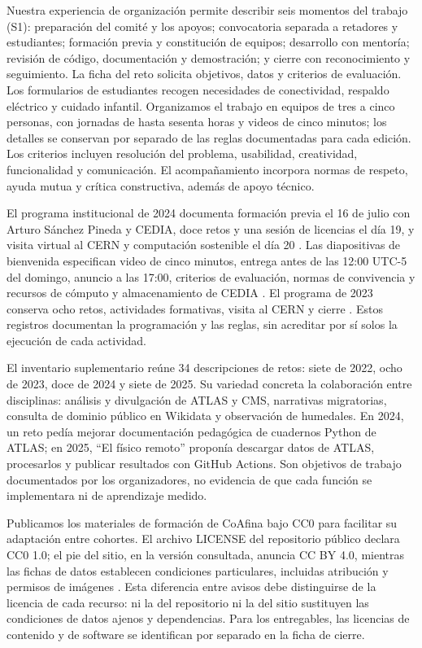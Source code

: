 Nuestra experiencia de organización permite describir seis momentos del trabajo (S1): preparación del comité y los apoyos; convocatoria separada a retadores y estudiantes; formación previa y constitución de equipos; desarrollo con mentoría; revisión de código, documentación y demostración; y cierre con reconocimiento y seguimiento. La ficha del reto solicita objetivos, datos y criterios de evaluación. Los formularios de estudiantes recogen necesidades de conectividad, respaldo eléctrico y cuidado infantil. Organizamos el trabajo en equipos de tres a cinco personas, con jornadas de hasta sesenta horas y videos de cinco minutos; los detalles se conservan por separado de las reglas documentadas para cada edición. Los criterios incluyen resolución del problema, usabilidad, creatividad, funcionalidad y comunicación. El acompañamiento incorpora normas de respeto, ayuda mutua y crítica constructiva, además de apoyo técnico.

El programa institucional de 2024 documenta formación previa el 16 de julio con Arturo Sánchez Pineda y CEDIA, doce retos y una sesión de licencias el día 19, y visita virtual al CERN y computación sostenible el día 20 \cite{programa2024}. Las diapositivas de bienvenida especifican video de cinco minutos, entrega antes de las 12:00 UTC-5 del domingo, anuncio a las 17:00, criterios de evaluación, normas de convivencia y recursos de cómputo y almacenamiento de CEDIA \cite{bienvenida2024}. El programa de 2023 conserva ocho retos, actividades formativas, visita al CERN y cierre \cite{programa2023}. Estos registros documentan la programación y las reglas, sin acreditar por sí solos la ejecución de cada actividad.

El inventario suplementario reúne 34 descripciones de retos: siete de 2022, ocho de 2023, doce de 2024 y siete de 2025. Su variedad concreta la colaboración entre disciplinas: análisis y divulgación de ATLAS y CMS, narrativas migratorias, consulta de dominio público en Wikidata y observación de humedales. En 2024, un reto pedía mejorar documentación pedagógica de cuadernos Python de ATLAS; en 2025, ``El físico remoto'' proponía descargar datos de ATLAS, procesarlos y publicar resultados con GitHub Actions. Son objetivos de trabajo documentados por los organizadores, no evidencia de que cada función se implementara ni de aprendizaje medido.

Publicamos los materiales de formación de CoAfina bajo CC0 para facilitar su adaptación entre cohortes. El archivo LICENSE del repositorio público declara CC0 1.0; el pie del sitio, en la versión consultada, anuncia CC BY 4.0, mientras las fichas de datos establecen condiciones particulares, incluidas atribución y permisos de imágenes \cite{coafinalicencias}. Esta diferencia entre avisos debe distinguirse de la licencia de cada recurso: ni la del repositorio ni la del sitio sustituyen las condiciones de datos ajenos y dependencias. Para los entregables, las licencias de contenido y de software se identifican por separado en la ficha de cierre.

